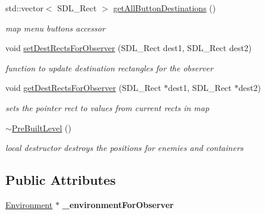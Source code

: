 \begin{DoxyCompactItemize}
\hypertarget{class_pre_built_level_ac03a041e9981a044dceb7aa0b2fa5639}{}\label{class_pre_built_level_ac03a041e9981a044dceb7aa0b2fa5639} 
std\+::vector$<$ S\+D\+L\+\_\+\+Rect $>$ \hyperlink{class_pre_built_level_ac03a041e9981a044dceb7aa0b2fa5639}{get\+All\+Button\+Destinations} ()
\begin{DoxyCompactList}\small\item\em map menu buttons accessor \end{DoxyCompactList}\item 
\hypertarget{class_pre_built_level_a9b04d07e4d36055d676d359f753ea6ae}{}\label{class_pre_built_level_a9b04d07e4d36055d676d359f753ea6ae} 
void \hyperlink{class_pre_built_level_a9b04d07e4d36055d676d359f753ea6ae}{set\+Dest\+Rects\+For\+Observer} (S\+D\+L\+\_\+\+Rect dest1, S\+D\+L\+\_\+\+Rect dest2)
\begin{DoxyCompactList}\small\item\em function to update destination rectangles for the observer \end{DoxyCompactList}\item 
\hypertarget{class_pre_built_level_ab96ad8d821e97b075c0bf616ef8eddd5}{}\label{class_pre_built_level_ab96ad8d821e97b075c0bf616ef8eddd5} 
void \hyperlink{class_pre_built_level_ab96ad8d821e97b075c0bf616ef8eddd5}{get\+Dest\+Rects\+For\+Observer} (S\+D\+L\+\_\+\+Rect $\ast$dest1, S\+D\+L\+\_\+\+Rect $\ast$dest2)
\begin{DoxyCompactList}\small\item\em sets the pointer rect to values from current rects in map \end{DoxyCompactList}\item 
\hypertarget{class_pre_built_level_a06411fd72dc81d3792c3e6e6fe0fc416}{}\label{class_pre_built_level_a06411fd72dc81d3792c3e6e6fe0fc416} 
\hyperlink{class_pre_built_level_a06411fd72dc81d3792c3e6e6fe0fc416}{$\sim$\+Pre\+Built\+Level} ()
\begin{DoxyCompactList}\small\item\em local destructor destroys the positions for enemies and containers \end{DoxyCompactList}\end{DoxyCompactItemize}
\subsection*{Public Attributes}
\begin{DoxyCompactItemize}
\item 
\hypertarget{class_pre_built_level_a318774652d942b3ed8f1d22b3a2e992d}{}\label{class_pre_built_level_a318774652d942b3ed8f1d22b3a2e992d} 
\hyperlink{class_environment}{Environment} $\ast$ {\bfseries \+\_\+environment\+For\+Observer}
\end{DoxyCompactItemize}
